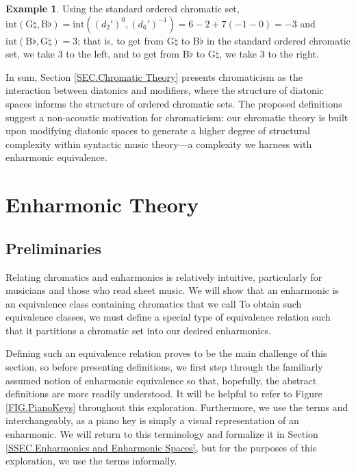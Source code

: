 \documentclass{article}
\theoremstyle{plain}
\theoremstyle{definition}
\newtheorem{example}[theorem]{Example}
\theoremstyle{remark}
\begin{document}
\begin{example}
	Using the standard ordered chromatic set, $\textrm{int}{(\textrm{G}\natural,\textrm{B}\flat)}=\textrm{int}{((d_2')^0,(d_6')^{-1})}=6-2+7(-1-0)=-3$ and $\textrm{int}{(\textrm{B}\flat,\textrm{G}\natural)}=3$; that is, to get from G$\natural$ to B$\flat$ in the standard ordered chromatic set, we take $3$  to the left, and to get from B$\flat$ to G$\natural$, we take $3$  to the right.
\end{example}

In sum, Section \ref{SEC.Chromatic Theory} presents chromaticism as the interaction between diatonics and modifiers, where the structure of diatonic spaces informs the structure of ordered chromatic sets. The proposed definitions suggest a non-acoustic motivation for chromaticism: our chromatic theory is built upon modifying diatonic spaces to generate a higher degree of structural complexity within syntactic music theory---a complexity we harness with enharmonic equivalence.

\section{Enharmonic Theory}
\label{SEC.Enharmonic Theory}

\subsection{Preliminaries}
\label{SSEC.Preliminaries}

Relating chromatics and enharmonics is relatively intuitive, particularly for musicians and those who read sheet music. We will show that an enharmonic is an equivalence class containing chromatics that we call  To obtain such equivalence classes, we must define a special type of equivalence relation such that it partitions a chromatic set into our desired enharmonics.

Defining such an equivalence relation proves to be the main challenge of this section, so before presenting definitions, we first step through the familiarly assumed notion of enharmonic equivalence so that, hopefully, the abstract definitions are more readily understood. It will be helpful to refer to Figure \ref{FIG.PianoKeys} throughout this exploration. Furthermore, we use the terms  and  interchangeably, as a piano key is simply a visual representation of an enharmonic. We will return to this terminology and formalize it in Section \ref{SSEC.Enharmonics and Enharmonic Spaces}, but for the purposes of this exploration, we use the terms informally.
\end{document}
